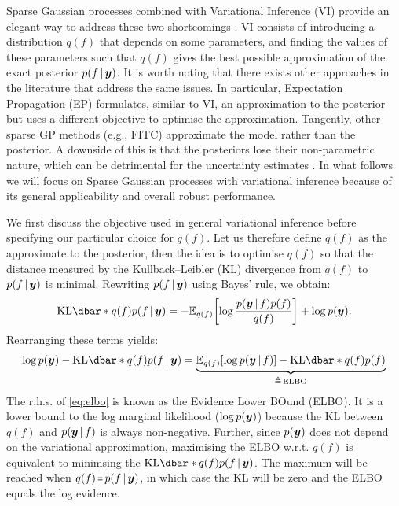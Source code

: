 Sparse Gaussian processes combined with Variational Inference (VI) provide an elegant way to address these two shortcomings \citep{titsias2009, hensman2013, hensman2015scalable}. VI consists of introducing a distribution $q(f)$ that depends on some parameters, and finding the values of these parameters such that $q(f)$ gives the best possible approximation of the exact posterior $p(f \,|\, \bm{y} )$. It is worth noting that there exists other approaches in the literature that address the same issues. In particular, Expectation Propagation (EP) \citep{minka2001expectation,bui2017unifying} formulates, similar to VI, an approximation to the posterior but uses a different objective to optimise the approximation. Tangently, other sparse GP methods (e.g., FITC) \citep{Snelson05,quinonero2005unifying} approximate the model rather than the posterior. A downside of this is that the posteriors lose their non-parametric nature, which can be detrimental for the uncertainty estimates \citep{bauer2016understanding}. In what follows we will focus on Sparse Gaussian processes with variational inference because of its general applicability and overall robust performance.

We first discuss the objective used in general variational inference before specifying our particular choice for $q(f)$. Let us therefore define $q(f)$ as the approximate to the posterior, then the idea is to optimise $q(f)$ so that the distance measured by the Kullback–Leibler (KL) divergence from $q(f)$ to $p(f \,|\, \bm{y})$ is minimal. Rewriting $p(f \,|\, \bm{y})$ using Bayes' rule, we obtain:
\begin{equation}
  \KL{q(f)}{p(f \given \vy)} = -{\Exp{q(f)}{\log \frac{p(\vy \given f) p(f)}{q(f)}}} + \log p(\vy).
\end{equation}
Rearranging these terms yields:
\begin{equation}
  \label{eq:elbo}
  \log p(\vy) - \KL{q(f)}{p(f \given \vy)} = 
  \underbrace{\Exp{q(f)}{\log p(\vy \given f)} - \KL{q(f)}{p(f)}}_{\triangleq\,\textrm{ELBO}}
\end{equation}
The r.h.s. of \cref{eq:elbo} is known as the Evidence Lower BOund (ELBO). It is a lower bound to the log marginal likelihood ($\log p(\bm{y})$) because the KL between $q(f)$ and $p(\bm{y} \,|\, f)$ is always non-negative. Further, since $p(\bm{y})$ does not depend on the variational approximation, maximising the ELBO w.r.t. $q(f)$ is equivalent to minimsing the $\KL{q(f)}{p(f \given \vy)}$. The maximum will be reached when $q(f) \shorteq p(f \given \vy)$, in which case the KL will be zero and the ELBO equals the log evidence. 

